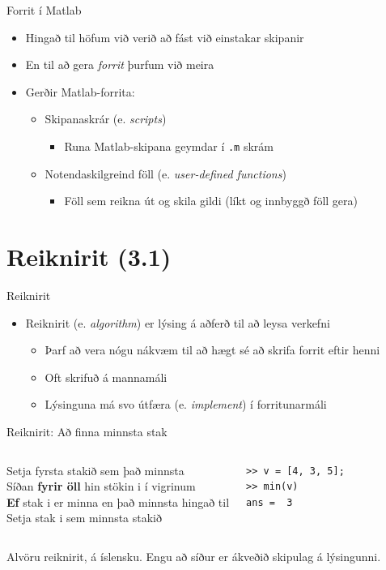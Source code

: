 \documentclass[handout]{beamer}
\begin{document}
\begin{frame}{Forrit í Matlab}
\begin{itemize}
 \item Hingað til höfum við verið að fást við einstakar skipanir
 \item En til að gera \emph{forrit} þurfum við meira
 \item Gerðir Matlab-forrita:
 \begin{itemize}
  \item Skipanaskrár (e. \emph{scripts})
  \begin{itemize}
   \item Runa Matlab-skipana geymdar í \texttt{.m} skrám
  \end{itemize}
  \item Notendaskilgreind föll (e. \emph{user-defined functions})
  \begin{itemize}
   \item Föll sem reikna út og skila gildi (líkt og innbyggð föll gera)
  \end{itemize}
 \end{itemize}
\end{itemize}
\end{frame}

\section{Reiknirit (3.1)}

\begin{frame}{Reiknirit}
\begin{itemize}
 \item Reiknirit (e. \emph{algorithm}) er lýsing á aðferð til að leysa verkefni
 \begin{itemize}
  \item Þarf að vera nógu nákvæm til að hægt sé að skrifa forrit eftir henni
  \item Oft skrifuð á mannamáli
  \item Lýsinguna má svo útfæra (e. \emph{implement}) í forritunarmáli
 \end{itemize}
\end{itemize}
\end{frame}

\begin{frame}[fragile]{Reiknirit: Að finna minnsta stak}
\begin{columns}
Setja fyrsta stakið sem það minnsta\\
Síðan \textbf{fyrir öll} hin stökin i í vigrinum\\
\quad \textbf{Ef} stak i er minna en það minnsta hingað til\\
\qquad Setja stak i sem minnsta stakið
\begin{verbatim}
>> v = [4, 3, 5];
>> min(v)
ans =  3
\end{verbatim}
\end{columns}
\vspace{1cm}
Alvöru reiknirit, á íslensku. Engu að síður er ákveðið skipulag á lýsingunni.
\end{frame}
\end{document}
